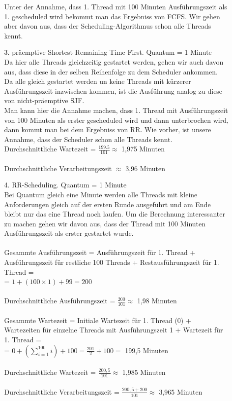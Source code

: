 \begin{enumerate}
\begin{enumerate}
Unter der Annahme, dass 1. Thread mit 100 Minuten Ausführungszeit als 1. gescheduled wird bekommt man das Ergebniss von FCFS. Wir gehen aber davon aus, dass der Scheduling-Algorithmus schon alle Threads kennt.

\item[3. ] präemptive Shortest Remaining Time First. Quantum = 1 Minute \\
Da hier alle Threads gleichzeitig gestartet werden, gehen wir auch davon aus, dass diese in der selben Reihenfolge zu dem Scheduler ankommen. Da alle gleich gestartet werden un keine Threads mit kürzerer Ausführungszeit inzwischen kommen, ist die Ausführung analog zu diese von nicht-präemptive SJF. \\

Man kann hier die Annahme machen, dass 1. Thread mit Ausführungszeit von 100 Minuten als erster gescheduled wird und dann unterbrochen wird, dann kommt man bei dem Ergebniss von RR. Wie vorher, ist unsere Annahme, dass der Scheduler schon alle Threads kennt. \\

Durchschnittliche Wartezeit = $\frac{199.5}{101} \approx $ 1,975 Minuten \\ \\
Durchschnittliche Verarbeitungszeit $\approx$ 3,96 Minuten \\ 

\item[4. ] RR-Scheduling. Quantum = 1 Minute \\
Bei Quantum gleich eine Minute werden alle Threads mit kleine Anforderungen gleich auf der ersten Runde ausgeführt und am Ende bleibt nur das eine Thread noch laufen. Um die Berechnung interessanter zu machen gehen wir davon aus, dass der Thread mit 100 Minuten Ausführungszeit als erster gestartet wurde.\\ \\
%
Gesammte Ausführungszeit = Ausführungszeit für 1. Thread + Ausführungszeit für restliche 100 Threads + Restausführungszeit für 1. Thread = \\
= $1 + (100 \times 1) + 99 = 200 $ \\ \\
Durchschnittliche Ausführungszeit = $\frac{200}{101} \approx $ 1,98 Minuten \\ \\
Gesammte Wartezeit = Initiale Wartezeit für 1. Thread (0) + Wartezeiten für einzelne Threads mit Ausführungszeit 1 + Wartezeit für 1. Thread = \\
= $ 0 + (\sum_{i=1}^{100} i) + 100 =  \frac{201}{2} + 100 =  $ 199,5 Minuten \\ \\
Durchschnittliche Wartezeit = $\frac{200,5}{101} \approx $ 1,985 Minuten \\ \\
Durchschnittliche Verarbeitungszeit = $\frac{200,5 + 200}{101} \approx $ 3,965 Minuten 



\end{enumerate}
\end{enumerate}
